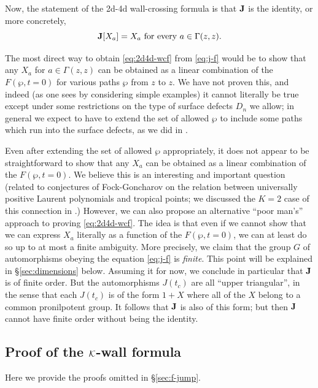 \documentclass[11pt,a4paper]{article}
\def\cK{{\cal K}}
\newcommand{\ti}[1]{\textit{#1}}
\begin{document}
Now, the statement of the 2d-4d wall-crossing formula is that  ${\bf J}$ is the identity, or more concretely,
\begin{equation} \label{eq:2d4d-wcf}
 {\bf J}[X_a] = X_a \text { for every } a \in \Gamma(z,z).
\end{equation}

The most direct way to obtain \eqref{eq:2d4d-wcf} from \eqref{eq:j-f} would be to show that
any $X_a$ for $a \in \Gamma(z,z)$
can be obtained as a linear combination of the $F(\wp, t=0)$ for various paths $\wp$
from $z$ to $z$.  We have not proven this, and indeed (as one sees by considering simple examples)
it cannot literally be true except under some
restrictions on the type of surface defects $D_n$ we allow; in general we expect to have to extend the set of
allowed $\wp$ to include some paths which run into the surface defects, as we did in \cite{Gaiotto:2010be}.

Even after extending the set of allowed $\wp$ appropriately, it does not appear to be straightforward
to show that any $X_a$ can be obtained as a linear combination of the $F(\wp, t=0)$.  We believe this is
an interesting and important question (related to conjectures of Fock-Goncharov on the relation between
universally positive Laurent polynomials and tropical points; we discussed the $K=2$ case of this connection
in \cite{Gaiotto:2010be}.)
However, we can also propose an alternative ``poor man's'' approach to proving \eqref{eq:2d4d-wcf}.
The idea is that even if we
cannot show that we can express $X_a$ literally as a function of the $F(\wp, t=0)$, we can at least
do so up to at most a finite ambiguity.  More precisely, we claim that
the group $G$ of automorphisms obeying the equation \eqref{eq:j-f} is \ti{finite}.
This point will be explained in \S\ref{sec:dimensions} below.  Assuming it for now, we conclude in particular that ${\bf J}$ is of finite order.
But the automorphisms $J(t_c)$ are all ``upper triangular'', in the sense that each $J(t_c)$
is of the form $1 + X$ where all of the $X$ belong to a common pronilpotent group.
It follows that ${\bf J}$ is also of this form; but then
${\bf J}$ cannot have finite order without being the identity.



\subsection{Proof of the $\cK$-wall formula} \label{sec:k-proof}

Here we provide the proofs omitted in \S\ref{sec:f-jump}.
\end{document}
